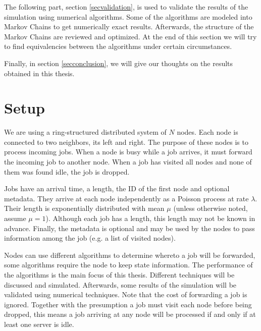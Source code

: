 \documentclass[10pt,a4paper]{article}
\begin{document}
The following part, section \ref{secvalidation}, is used to validate the results of the simulation using numerical algorithms. Some of the algorithms are modeled into Markov Chains to get numerically exact results. Afterwards, the structure of the Markov Chains are reviewed and optimized. At the end of this section we will try to find equivalencies between the algorithms under certain circumstances.

Finally, in section \ref{secconclusion}, we will give our thoughts on the results obtained in this thesis.

\section{Setup}
\label{secsetup}
We are using a ring-structured distributed system of $N$ nodes. Each node is connected to two neighbors, its left and right. The purpose of these nodes is to process incoming jobs. When a node is busy while a job arrives, it must forward the incoming job to another node. When a job has visited all nodes and none of them was found idle, the job is dropped.

Jobs have an arrival time, a length, the ID of the first node and optional metadata. They arrive at each node independently as a Poisson process at rate $\lambda$. Their length is exponentially distributed with mean $\mu$ (unless otherwise noted, assume $\mu=1$). Although each job has a length, this length may not be known in advance. Finally, the metadata is optional and may be used by the nodes to pass information among the job (e.g. a list of visited nodes).

Nodes can use different algorithms to determine whereto a job will be forwarded, some algorithms require the node to keep state information. The performance of the algorithms is the main focus of this thesis. Different techniques will be discussed and simulated. Afterwards, some results of the simulation will be validated using numerical techniques.
Note that the cost of forwarding a job is ignored. Together with the presumption a job must visit each node before being dropped, this means a job arriving at any node will be processed if and only if at least one server is idle.
\end{document}
